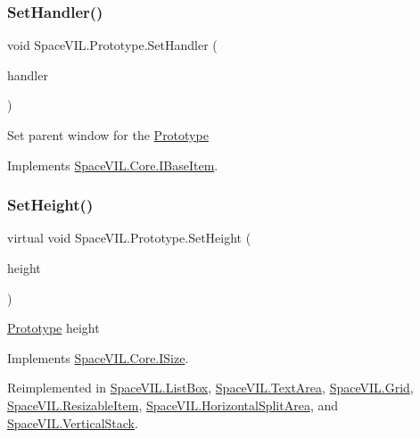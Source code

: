 \subsubsection{\texorpdfstring{Set\+Handler()}{SetHandler()}}
{\footnotesize\ttfamily void Space\+V\+I\+L.\+Prototype.\+Set\+Handler (\begin{DoxyParamCaption}\item[{\mbox{\hyperlink{class_space_v_i_l_1_1_window_layout}{Window\+Layout}}}]{handler }\end{DoxyParamCaption})}



Set parent window for the \mbox{\hyperlink{class_space_v_i_l_1_1_prototype}{Prototype}} 



Implements \mbox{\hyperlink{interface_space_v_i_l_1_1_core_1_1_i_base_item}{Space\+V\+I\+L.\+Core.\+I\+Base\+Item}}.

\mbox{\label{class_space_v_i_l_1_1_prototype_adc0adcbd1c3800d9525798ba7be5832a}} 
\subsubsection{\texorpdfstring{Set\+Height()}{SetHeight()}}
{\footnotesize\ttfamily virtual void Space\+V\+I\+L.\+Prototype.\+Set\+Height (\begin{DoxyParamCaption}\item[{int}]{height }\end{DoxyParamCaption})\hspace{0.3cm}{\ttfamily [virtual]}}



\mbox{\hyperlink{class_space_v_i_l_1_1_prototype}{Prototype}} height 



Implements \mbox{\hyperlink{interface_space_v_i_l_1_1_core_1_1_i_size}{Space\+V\+I\+L.\+Core.\+I\+Size}}.



Reimplemented in \mbox{\hyperlink{class_space_v_i_l_1_1_list_box_a5b44bd011e83b56053b529cf55253296}{Space\+V\+I\+L.\+List\+Box}}, \mbox{\hyperlink{class_space_v_i_l_1_1_text_area_abb58c3f9396680f5d2c7f238c0d6e0bb}{Space\+V\+I\+L.\+Text\+Area}}, \mbox{\hyperlink{class_space_v_i_l_1_1_grid_a64c7b1987fb8823330dbeaea7420369c}{Space\+V\+I\+L.\+Grid}}, \mbox{\hyperlink{class_space_v_i_l_1_1_resizable_item_a9ffdafec963a452576589d3efc452356}{Space\+V\+I\+L.\+Resizable\+Item}}, \mbox{\hyperlink{class_space_v_i_l_1_1_horizontal_split_area_ab018f220de9d5f76f52d3068925d1bdf}{Space\+V\+I\+L.\+Horizontal\+Split\+Area}}, and \mbox{\hyperlink{class_space_v_i_l_1_1_vertical_stack_a1e2360b005a6fb8e503dc60d27f1f021}{Space\+V\+I\+L.\+Vertical\+Stack}}.

